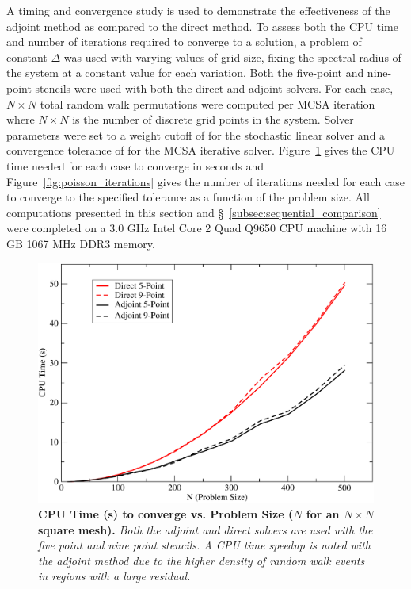 A timing and convergence study is used to demonstrate the
effectiveness of the adjoint method as compared to the direct
method. To assess both the CPU time and number of iterations required
to converge to a solution, a problem of constant $\Delta$ was used
with varying values of grid size, fixing the spectral radius of the
system at a constant value for each variation. Both the five-point and
nine-point stencils were used with both the direct and adjoint
solvers. For each case, $N \times N$ total random walk permutations
were computed per MCSA iteration where $N \times N$ is the number of
discrete grid points in the system. Solver parameters were set to a
weight cutoff of  for the stochastic linear solver and a
convergence tolerance of  for the MCSA iterative solver.
Figure~\ref{fig:poisson_cpu_time} gives the CPU time needed for each
case to converge in seconds and Figure~\ref{fig:poisson_iterations}
gives the number of iterations needed for each case to converge to the
specified tolerance as a function of the problem size. All
computations presented in this section and
\S~\ref{subsec:sequential_comparison} were completed on a 3.0 GHz
Intel Core 2 Quad Q9650 CPU machine with 16 GB 1067 MHz DDR3 memory.
\begin{figure}[ht!]
  \centering
  \includegraphics[width=5in,clip]{chapters/mc_background/dir_adj_cpu.pdf}
  \caption{\textbf{CPU Time (s) to converge vs. Problem Size ($N$ for
      an $N \times N$ square mesh).} \textit{Both the adjoint and
      direct solvers are used with the five point and nine point
      stencils. A CPU time speedup is noted with the adjoint method
      due to the higher density of random walk events in regions with
      a large residual.}}
  \label{fig:poisson_cpu_time}
\end{figure}


